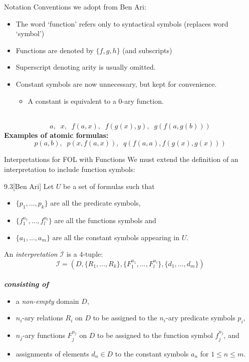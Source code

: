 \begin{wideslide}[bm=,toc=]{Notation}
Conventions we adopt from Ben Ari:
\begin{itemize}
\item<2-> The word `function' refers only to syntactical symbols (replaces word `symbol') 
\item<3-> Functions are denoted by $\{f,g,h\}$ (and subscripts)
\item<4-> Superscript denoting arity is usually omitted.
\item<5-> Constant symbols are now unnecessary, but kept for convenience.
\begin{itemize}
\item<6-> A constant is equivalent to a $0$-ary function.
\end{itemize}
\end{itemize}
~\\
\[
  a,\;\; x,\;\; f(a,x),\;\; f(g(x),y),\;\; g(f(a,g(b)))
  \]
\pause
{\bf Examples of atomic formulas:}
\[
  p(a,b),\;\; p(x,f(a,x)),\;\; q(f(a,a), f(g(x),g(x)))
\]
\end{wideslide}

\begin{wideslide}[bm=,toc=]{Interpretations for FOL with Functions}
We must extend the definition of an interpretation to include function symbols:
\pause
\begin{defn}{9.3}[Ben Ari]
Let $U$ be a set of formulas such that 
\begin{itemize}
\item<3-> $\{p_1,...,p_k\}$ are all the predicate symbols, 
\item<4-> $\{f_1^{n_1},...,f_l^{n_l}\}$ are all the functions symbols and
\item<5-> $\{a_1,...,a_m\}$ are all the constant symbols appearing in $U$. 
\end{itemize}
\pause[4]
An \emph{interpretation} $\mathcal{I}$ is a $4$-tuple:
\vspace{-2mm}
\[
  \mathcal{I} = (D, \{R_1,...,R_k\}, \{F_1^{n_1},...,F_l^{n_l}\},\{d_1,...,d_m\})
  \]~\\
\vspace{-8mm}
\pause
\textbf{\emph{consisting of}}
\begin{itemize}
\item<8-> a \emph{non-empty} domain $D$,
\item<9-> $n_i$-ary relations $R_i$ on $D$ to be assigned to the $n_i$-ary predicate symbols $p_i$, 
\item<10-> $n_j$-ary functions $F_j^{n_j}$ on $D$ to be assigned to the function symbol $f_j^{n_j}$, and 
\item<11-> assignments of elements $d_n \in D$ to the constant symbols $a_n$ for $1 \leq n \leq m$.
\end{itemize}
\end{defn}
\end{wideslide}

